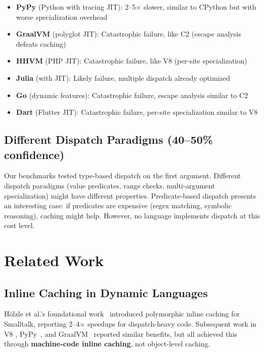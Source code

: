 \documentclass[sigplan,final]{acmart}
\begin{document}
\begin{itemize}
  \item \textbf{PyPy} (Python with tracing JIT): 2--5× slower, similar to CPython but with worse
    specialization overhead

  \item \textbf{GraalVM} (polyglot JIT): Catastrophic failure, like C2 (escape analysis defeats
    caching)

  \item \textbf{HHVM} (PHP JIT): Catastrophic failure, like V8 (per-site specialization)

  \item \textbf{Julia} (with JIT): Likely failure, multiple dispatch already optimized

  \item \textbf{Go} (dynamic features): Catastrophic failure, escape analysis similar to C2

  \item \textbf{Dart} (Flutter JIT): Catastrophic failure, per-site specialization similar to V8
\end{itemize}

\subsection{Different Dispatch Paradigms (40--50\% confidence)}

Our benchmarks tested type-based dispatch on the first argument. Different dispatch paradigms
(value predicates, range checks, multi-argument specialization) might have different properties.
Predicate-based dispatch presents an interesting case: if predicates are expensive (regex matching,
symbolic reasoning), caching might help. However, no language implements dispatch at this cost
level.

\section{Related Work}

\subsection{Inline Caching in Dynamic Languages}

Hölzle et al.'s foundational work~\cite{hoelzle1991optimizing} introduced polymorphic inline
caching for Smalltalk, reporting 2--4× speedups for dispatch-heavy code. Subsequent work in V8
\cite{bak2010v8}, PyPy~\cite{pypy2}, and GraalVM~\cite{graalvm} reported similar benefits, but
all achieved this through \textbf{machine-code inline caching}, not object-level caching.
\end{document}
